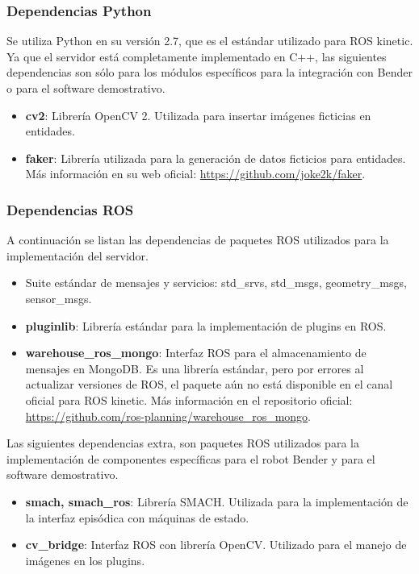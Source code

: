 \subsubsection{Dependencias Python}

Se utiliza Python en su versión 2.7, que es el estándar utilizado para ROS kinetic. Ya que el servidor está completamente implementado en C++, las siguientes dependencias son sólo para los módulos específicos para la integración con Bender o para el software demostrativo.

\begin{itemize}
\item {\bfseries cv2}: Librería OpenCV 2. Utilizada para insertar imágenes ficticias en entidades. 
\item {\bfseries faker}: Librería utilizada para la generación de datos ficticios para entidades. Más información en su web oficial: \url{https://github.com/joke2k/faker}.
\end{itemize}


\subsubsection{Dependencias ROS}

A continuación se listan las dependencias de paquetes ROS utilizados para la implementación del servidor.
\begin{itemize}
	\item Suite estándar de mensajes y servicios: std\_srvs, std\_msgs, geometry\_msgs, sensor\_msgs.
	\item {\bfseries pluginlib}: Librería estándar para la implementación de plugins en ROS.
	\item {\bfseries warehouse\_ros\_mongo}: Interfaz ROS para el almacenamiento de mensajes en MongoDB. Es una librería estándar, pero por errores al actualizar versiones de ROS, el paquete aún no está disponible en el canal oficial para ROS kinetic. Más información en el repositorio oficial: \url{https://github.com/ros-planning/warehouse\_ros\_mongo}.
\end{itemize}

Las siguientes dependencias extra, son paquetes ROS utilizados para la implementación de componentes específicas para el robot Bender y para el software demostrativo.
\begin{itemize}
\item {\bfseries smach, smach\_ros}: Librería SMACH. Utilizada para la implementación de la interfaz episódica con máquinas de estado.
\item {\bfseries cv\_bridge}: Interfaz ROS con librería OpenCV. Utilizado para el manejo de imágenes en los plugins.
\end{itemize}



